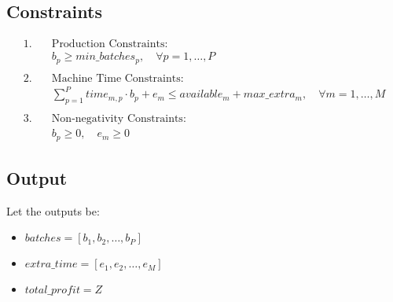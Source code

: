 \documentclass{article}
\begin{document}
\subsection*{Constraints}
\begin{align*}
1. & \quad \text{Production Constraints:} \\
   & \quad b_p \geq min\_batches_p, \quad \forall p = 1, \ldots, P \\
\\
2. & \quad \text{Machine Time Constraints:} \\
   & \quad \sum_{p=1}^{P} time_{m,p} \cdot b_p + e_m \leq available_m + max\_extra_m, \quad \forall m = 1, \ldots, M \\
\\
3. & \quad \text{Non-negativity Constraints:} \\
   & \quad b_p \geq 0, \quad e_m \geq 0
\end{align*}

\subsection*{Output}
Let the outputs be:
\begin{itemize}
    \item \( batches = [b_1, b_2, \ldots, b_P] \)
    \item \( extra\_time = [e_1, e_2, \ldots, e_M] \)
    \item \( total\_profit = Z \)
\end{itemize}
\end{document}
